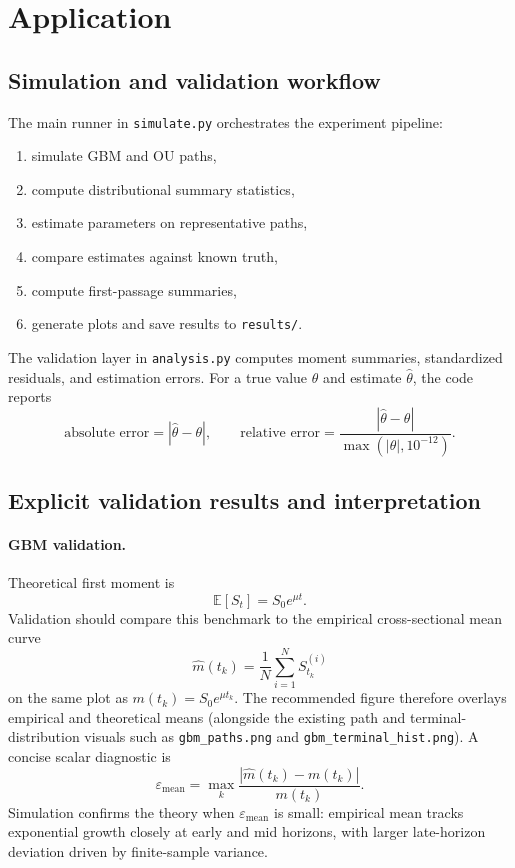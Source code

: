 \documentclass[11pt]{article}
\newcommand{\E}{\mathbb{E}}
\begin{document}
\section{Application}

\subsection{Simulation and validation workflow}

The main runner in \texttt{simulate.py} orchestrates the experiment pipeline:
\begin{enumerate}[leftmargin=1.5em]
  \item simulate GBM and OU paths,
  \item compute distributional summary statistics,
  \item estimate parameters on representative paths,
  \item compare estimates against known truth,
  \item compute first-passage summaries,
  \item generate plots and save results to \texttt{results/}.
\end{enumerate}

The validation layer in \texttt{analysis.py} computes moment summaries, standardized residuals, and estimation errors. For a true value $\theta$ and estimate $\hat\theta$, the code reports
\begin{equation}
  \text{absolute error} = |\hat\theta - \theta|,
  \qquad
  \text{relative error} = \frac{|\hat\theta - \theta|}{\max(|\theta|,10^{-12})}.
\end{equation}

\subsection{Explicit validation results and interpretation}

\paragraph{GBM validation.}
Theoretical first moment is
\begin{equation}
  \E[S_t] = S_0 e^{\mu t}.
\end{equation}
Validation should compare this benchmark to the empirical cross-sectional mean curve
\begin{equation}
  \widehat m(t_k) = \frac{1}{N}\sum_{i=1}^N S_{t_k}^{(i)}
\end{equation}
on the same plot as $m(t_k)=S_0e^{\mu t_k}$. The recommended figure therefore overlays empirical and theoretical means (alongside the existing path and terminal-distribution visuals such as \texttt{gbm\_paths.png} and \texttt{gbm\_terminal\_hist.png}). A concise scalar diagnostic is
\begin{equation}
  \varepsilon_{\text{mean}} = \max_k \frac{|\widehat m(t_k)-m(t_k)|}{m(t_k)}.
\end{equation}
Simulation confirms the theory when $\varepsilon_{\text{mean}}$ is small: empirical mean tracks exponential growth closely at early and mid horizons, with larger late-horizon deviation driven by finite-sample variance.
\end{document}
